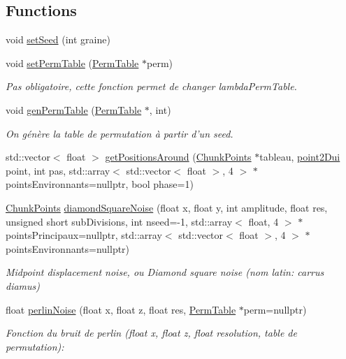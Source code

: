 \subsection*{Functions}
\begin{DoxyCompactItemize}
\item 
void \hyperlink{namespace_unoise_a5dbbb2ae6c75efd29abd5663db08ec0e}{set\-Seed} (int graine)
\item 
void \hyperlink{namespace_unoise_aa8daebdaad2fc5a125cd7b1acc7a38b4}{set\-Perm\-Table} (\hyperlink{namespace_unoise_ae11142038f2dd1bea2711b2b99bbfaf6}{Perm\-Table} $\ast$perm)
\begin{DoxyCompactList}\small\item\em Pas obligatoire, cette fonction permet de changer lambda\-Perm\-Table. \end{DoxyCompactList}\item 
void \hyperlink{namespace_unoise_a5a1dbb7caee818c615fdfedc2ff19730}{gen\-Perm\-Table} (\hyperlink{namespace_unoise_ae11142038f2dd1bea2711b2b99bbfaf6}{Perm\-Table} $\ast$, int)
\begin{DoxyCompactList}\small\item\em On génère la table de permutation à partir d'un seed. \end{DoxyCompactList}\item 
std\-::vector$<$ float $>$ \hyperlink{namespace_unoise_aa685d2a385bbfe1a71a1650004238202}{get\-Positions\-Around} (\hyperlink{namespace_unoise_ac1e5c6227ab68e4e8c1ad57fdbddf51b}{Chunk\-Points} $\ast$tableau, \hyperlink{struct_unoise_1_1point2_dui}{point2\-Dui} point, int pas, std\-::array$<$ std\-::vector$<$ float $>$, 4 $>$ $\ast$points\-Environnants=nullptr, bool phase=1)
\item 
\hyperlink{namespace_unoise_ac1e5c6227ab68e4e8c1ad57fdbddf51b}{Chunk\-Points} \hyperlink{namespace_unoise_accabbc2fce05f7a55bd10ec573925275}{diamond\-Square\-Noise} (float x, float y, int amplitude, float res, unsigned short sub\-Divisions, int nseed=-\/1, std\-::array$<$ float, 4 $>$ $\ast$points\-Principaux=nullptr, std\-::array$<$ std\-::vector$<$ float $>$, 4 $>$ $\ast$points\-Environnants=nullptr)
\begin{DoxyCompactList}\small\item\em Midpoint displacement noise, ou Diamond square noise (nom latin\-: carrus diamus) \end{DoxyCompactList}\item 
float \hyperlink{namespace_unoise_a77b87fa88183eb7081d3ea602989c59e}{perlin\-Noise} (float x, float z, float res, \hyperlink{namespace_unoise_ae11142038f2dd1bea2711b2b99bbfaf6}{Perm\-Table} $\ast$perm=nullptr)
\begin{DoxyCompactList}\small\item\em Fonction du bruit de perlin (float x, float z, float resolution, table de permutation)\-: \end{DoxyCompactList}\end{DoxyCompactItemize}
